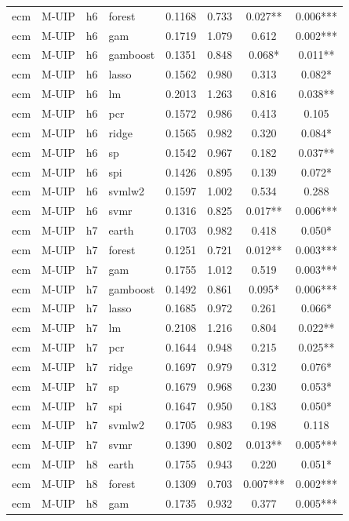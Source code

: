 \begin{ThreePartTable}
\begin{longtable}[t]{llclcccc}
ecm & M-UIP & h6 & forest & 0.1168 & 0.733 & 0.027** & 0.006***\\
ecm & M-UIP & h6 & gam & 0.1719 & 1.079 & 0.612 & 0.002***\\
ecm & M-UIP & h6 & gamboost & 0.1351 & 0.848 & 0.068* & 0.011**\\
ecm & M-UIP & h6 & lasso & 0.1562 & 0.980 & 0.313 & 0.082*\\
ecm & M-UIP & h6 & lm & 0.2013 & 1.263 & 0.816 & 0.038**\\
ecm & M-UIP & h6 & pcr & 0.1572 & 0.986 & 0.413 & 0.105\\
ecm & M-UIP & h6 & ridge & 0.1565 & 0.982 & 0.320 & 0.084*\\
ecm & M-UIP & h6 & sp & 0.1542 & 0.967 & 0.182 & 0.037**\\
ecm & M-UIP & h6 & spi & 0.1426 & 0.895 & 0.139 & 0.072*\\
ecm & M-UIP & h6 & svmlw2 & 0.1597 & 1.002 & 0.534 & 0.288\\
ecm & M-UIP & h6 & svmr & 0.1316 & 0.825 & 0.017** & 0.006***\\
\addlinespace
ecm & M-UIP & h7 & earth & 0.1703 & 0.982 & 0.418 & 0.050*\\
ecm & M-UIP & h7 & forest & 0.1251 & 0.721 & 0.012** & 0.003***\\
ecm & M-UIP & h7 & gam & 0.1755 & 1.012 & 0.519 & 0.003***\\
ecm & M-UIP & h7 & gamboost & 0.1492 & 0.861 & 0.095* & 0.006***\\
ecm & M-UIP & h7 & lasso & 0.1685 & 0.972 & 0.261 & 0.066*\\
ecm & M-UIP & h7 & lm & 0.2108 & 1.216 & 0.804 & 0.022**\\
ecm & M-UIP & h7 & pcr & 0.1644 & 0.948 & 0.215 & 0.025**\\
ecm & M-UIP & h7 & ridge & 0.1697 & 0.979 & 0.312 & 0.076*\\
ecm & M-UIP & h7 & sp & 0.1679 & 0.968 & 0.230 & 0.053*\\
ecm & M-UIP & h7 & spi & 0.1647 & 0.950 & 0.183 & 0.050*\\
ecm & M-UIP & h7 & svmlw2 & 0.1705 & 0.983 & 0.198 & 0.118\\
ecm & M-UIP & h7 & svmr & 0.1390 & 0.802 & 0.013** & 0.005***\\
\addlinespace
ecm & M-UIP & h8 & earth & 0.1755 & 0.943 & 0.220 & 0.051*\\
ecm & M-UIP & h8 & forest & 0.1309 & 0.703 & 0.007*** & 0.002***\\
ecm & M-UIP & h8 & gam & 0.1735 & 0.932 & 0.377 & 0.005***\\

\end{longtable}
\end{ThreePartTable}
